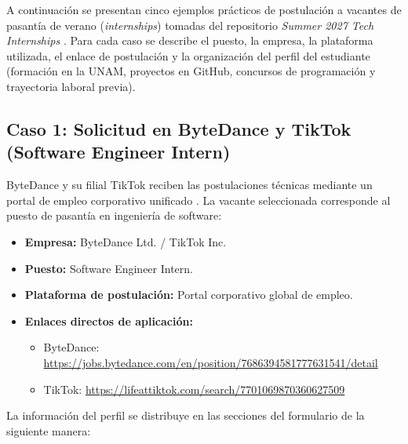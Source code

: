 \documentclass[12pt]{article}
\begin{document}
A continuación se presentan cinco ejemplos prácticos de postulación a vacantes de pasantía de verano (\textit{internships}) tomadas del repositorio \textit{Summer 2027 Tech Internships} \parencite{simplifyjobs2026summer}. Para cada caso se describe el puesto, la empresa, la plataforma utilizada, el enlace de postulación y la organización del perfil del estudiante (formación en la UNAM, proyectos en GitHub, concursos de programación y trayectoria laboral previa).

\subsection{Caso 1: Solicitud en ByteDance y TikTok (Software Engineer Intern)}
\label{sec:casoByteDance}

ByteDance y su filial TikTok reciben las postulaciones técnicas mediante un portal de empleo corporativo unificado \parencite{bytedance2026jobs, tiktok2026careers}. La vacante seleccionada corresponde al puesto de pasantía en ingeniería de software:

\begin{itemize}[leftmargin=0.2in, itemsep=0.2em]
    \item \textbf{Empresa:} ByteDance Ltd. / TikTok Inc.
    \item \textbf{Puesto:} Software Engineer Intern.
    \item \textbf{Plataforma de postulación:} Portal corporativo global de empleo.
    \item \textbf{Enlaces directos de aplicación:}
    \begin{itemize}[leftmargin=0.15in, noitemsep]
        \item ByteDance: {\footnotesize\url{https://jobs.bytedance.com/en/position/7686394581777631541/detail}}
        \item TikTok: {\footnotesize\url{https://lifeattiktok.com/search/7701069870360627509}}
    \end{itemize}
\end{itemize}

La información del perfil se distribuye en las secciones del formulario de la siguiente manera:
\end{document}

